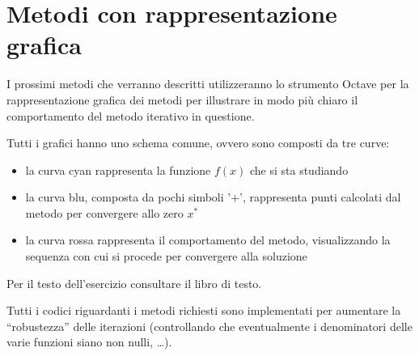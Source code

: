 \section*{Metodi con rappresentazione grafica}
I prossimi metodi che verranno descritti utilizzeranno lo strumento Octave
per la rappresentazione grafica dei metodi per illustrare in modo pi\`u chiaro
il comportamento del metodo iterativo in questione.

Tutti i grafici hanno uno schema comune, ovvero sono composti da tre curve:
\begin{itemize}
  \item la curva cyan rappresenta la funzione $f(x)$ che si sta studiando
  \item la curva blu, composta da pochi simboli '$+$', rappresenta punti
  calcolati dal metodo per convergere allo zero $x^{*}$
  \item la curva rossa rappresenta il comportamento del metodo, visualizzando
  la sequenza con cui si procede per convergere alla soluzione
\end{itemize}





\begin{exercise}[2.9]
Per il testo dell'esercizio consultare il libro di testo.
\end{exercise}
Tutti i codici riguardanti i metodi richiesti sono implementati per aumentare
la ``robustezza'' delle iterazioni (controllando che eventualmente i
denominatori delle varie funzioni siano non nulli, \ldots).
